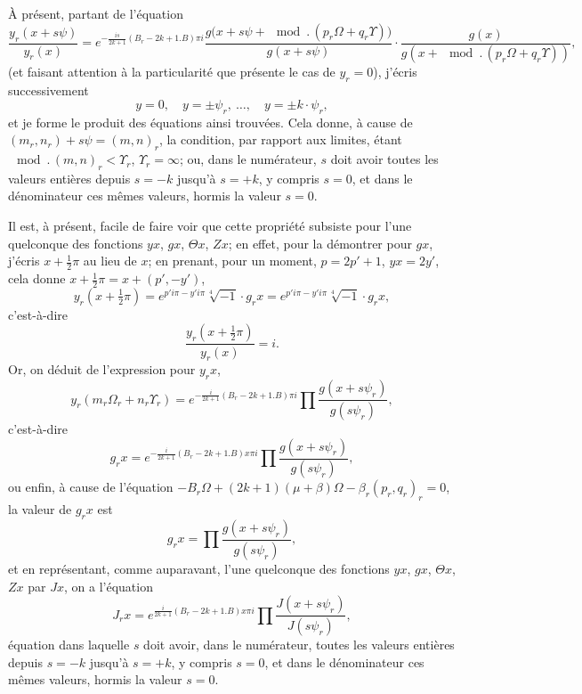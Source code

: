 \documentclass[11pt,a4paper]{book}
\begin{document}
\medskip

\`A pr\'esent, partant de l'\'equation
\[
\frac{y_r(x+s\psi)}{y_r(x)}
= e^{-\frac{is}{2k+1}(B_r-2k+1.B)\pi i}
\frac{g\bigl(x + s\psi + \mod.\,(p_r\Omega+q_r\Upsilon)\bigr)}{g(x+s\psi)}
\cdot
\frac{g(x)}{g(x+\mod.\,(p_r\Omega+q_r\Upsilon))},
\]
(et faisant attention \`a la particularit\'e que pr\'esente le cas de
$y_r = 0$), j'\'ecris successivement
\[
y = 0,\quad y = \pm\psi_r,\ \ldots,\quad y = \pm k\cdot\psi_r,
\]
et je forme le produit des \'equations ainsi trouv\'ees. Cela donne, \`a cause de
$(m_r, n_r) + s\psi = (m,n)_r$, la condition, par rapport aux limites,
\'etant $\mod.\,(m,n)_r < \Upsilon_r$, $\Upsilon_r = \infty$; ou, dans le
num\'erateur, $s$ doit avoir toutes les valeurs enti\`eres depuis $s=-k$
jusqu'\`a $s=+k$, y compris $s=0$, et dans le d\'enominateur ces m\^emes
valeurs, hormis la valeur $s=0$.

Il est, \`a pr\'esent, facile de faire voir que cette propri\'et\'e subsiste
pour l'une quelconque des fonctions $yx$, $gx$, $\Theta x$, $Zx$; en effet,
pour la d\'emontrer pour $gx$, j'\'ecris $x+\tfrac{1}{2}\pi$ au lieu de $x$;
en prenant, pour un moment, $p = 2p'+1$, $yx = 2y'$, cela donne
$x+\tfrac{1}{2}\pi = x+(p', -y')$,
\[
y_r(x+\tfrac{1}{2}\pi) = e^{p'i\pi - y'i\pi}\sqrt[4]{-1}\cdot g_r x
= e^{p'i\pi - y'i\pi} \sqrt[4]{-1} \cdot g_r x,
\]
c'est-\`a-dire
\[
\frac{y_r(x+\tfrac{1}{2}\pi)}{y_r(x)} = i.
\]
Or, on d\'eduit de l'expression pour $y_r x$,
\[
y_r(m_r\Omega_r + n_r\Upsilon_r) =
e^{-\frac{i}{2k+1}(B_r-2k+1.B)\pi i}
\prod \frac{g(x+s\psi_r)}{g(s\psi_r)},
\]
c'est-\`a-dire
\[
g_r x = e^{-\frac{i}{2k+1}(B_r-2k+1.B)x\pi i}
\prod \frac{g(x+s\psi_r)}{g(s\psi_r)},
\]
ou enfin, \`a cause de l'\'equation
$-B_r\Omega + (2k+1)(\mu+\beta)\Omega - \beta_r(p_r, q_r)_r = 0$,
la valeur de $g_r x$ est
\[
g_r x = \prod \frac{g(x+s\psi_r)}{g(s\psi_r)},
\]
et en repr\'esentant, comme auparavant, l'une quelconque des fonctions
$yx$, $gx$, $\Theta x$, $Zx$ par $Jx$, on a l'\'equation
\[
J_r x = e^{\frac{i}{2k+1}(B_r-2k+1.B)x\pi i}
\prod \frac{J(x+s\psi_r)}{J(s\psi_r)},
\]
\'equation dans laquelle $s$ doit avoir, dans le num\'erateur, toutes les
valeurs enti\`eres depuis $s=-k$ jusqu'\`a $s=+k$, y compris $s=0$, et dans
le d\'enominateur ces m\^emes valeurs, hormis la valeur $s=0$.
\end{document}
